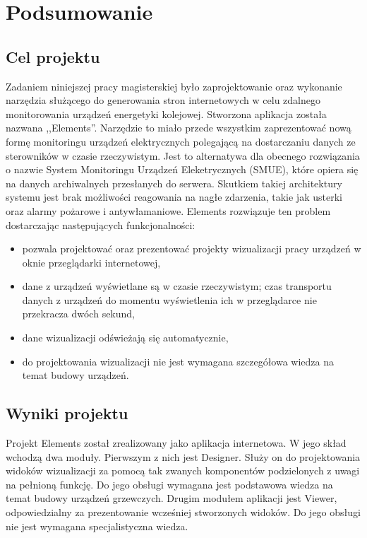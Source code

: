 \chapter{Podsumowanie}

\section{Cel projektu}
Zadaniem niniejszej pracy magisterskiej było zaprojektowanie oraz wykonanie narzędzia służącego do generowania stron internetowych w celu zdalnego monitorowania urządzeń energetyki kolejowej. Stworzona aplikacja została nazwana ,,Elements''. Narzędzie to miało przede wszystkim zaprezentować nową formę monitoringu urządzeń elektrycznych polegającą na dostarczaniu danych ze sterowników w czasie rzeczywistym. Jest to alternatywa dla obecnego rozwiązania o nazwie System Monitoringu Urządzeń Eleketrycznych (SMUE), które opiera się na danych archiwalnych przesłanych do serwera. Skutkiem takiej architektury systemu jest brak możliwości reagowania na nagłe zdarzenia, takie jak usterki oraz alarmy pożarowe i antywłamaniowe. Elements rozwiązuje ten problem dostarczając następujących funkcjonalności:
\begin{itemize}
\item pozwala projektować oraz prezentować projekty wizualizacji pracy urządzeń w oknie przeglądarki internetowej,
\item dane z urządzeń wyświetlane są w czasie rzeczywistym; czas transportu danych z urządzeń do momentu wyświetlenia ich w przeglądarce nie przekracza dwóch sekund,
\item dane wizualizacji odświeżają się automatycznie,
\item do projektowania wizualizacji nie jest wymagana szczegółowa wiedza na temat budowy urządzeń.
\end{itemize}


\section{Wyniki projektu}
Projekt Elements został zrealizowany jako aplikacja internetowa. W jego skład wchodzą dwa moduły. Pierwszym z nich jest Designer. Służy on do projektowania widoków wizualizacji za pomocą tak zwanych komponentów podzielonych z uwagi na pełnioną funkcję. Do jego obsługi wymagana jest podstawowa wiedza na temat budowy urządzeń grzewczych. Drugim modułem aplikacji jest Viewer, odpowiedzialny za prezentowanie wcześniej stworzonych widoków. Do jego obsługi nie jest wymagana specjalistyczna wiedza.


